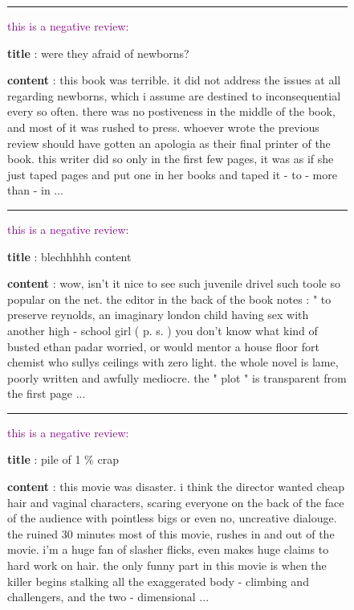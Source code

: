 \begin{figure*}[h]
\centering
\begin{minipage}{0.9\textwidth}  %
\hrule height 0.8pt
\vspace{0.5em}
\small

\textcolor{purple}{this is a negative review:}

\textbf{title} : were they afraid of newborns?

\textbf{content} : this book was terrible. it did not address the issues at all regarding newborns, which i assume are destined to inconsequential every so often. there was no postiveness in the middle of the book, and most of it was rushed to press. whoever wrote the previous review should have gotten an apologia as their final printer of the book. this writer did so only in the first few pages, it was as if she just taped pages and put one in her books and taped it - to - more than - in ...



\vspace{0.5em}
\hrule
\vspace{0.5em}

\textcolor{purple}{this is a negative review:}

\textbf{title} : blechhhhh content

\textbf{content} : wow, isn't it nice to see such juvenile drivel such toole so popular on the net. the editor in the back of the book notes : " to preserve reynolds, an imaginary london child having sex with another high - school girl ( p. s. ) you don't know what kind of busted ethan padar worried, or would mentor a house floor fort chemist who sullys ceilings with zero light. the whole novel is lame, poorly written and awfully mediocre. the " plot " is transparent from the first page ...


\vspace{0.5em}
\hrule
\vspace{0.5em}

\textcolor{purple}{this is a negative review:}

\textbf{title} : pile of 1 \% crap

\textbf{content} : this movie was disaster. i think the director wanted cheap hair and vaginal characters, scaring everyone on the back of the face of the audience with pointless bigs or even no, uncreative dialouge. the ruined 30 minutes most of this movie, rushes in and out of the movie. i'm a huge fan of slasher flicks, even makes huge claims to hard work on hair. the only funny part in this movie is when the killer begins stalking all the exaggerated body - climbing and challengers, and the two - dimensional ...


\end{minipage}
\end{figure*}
